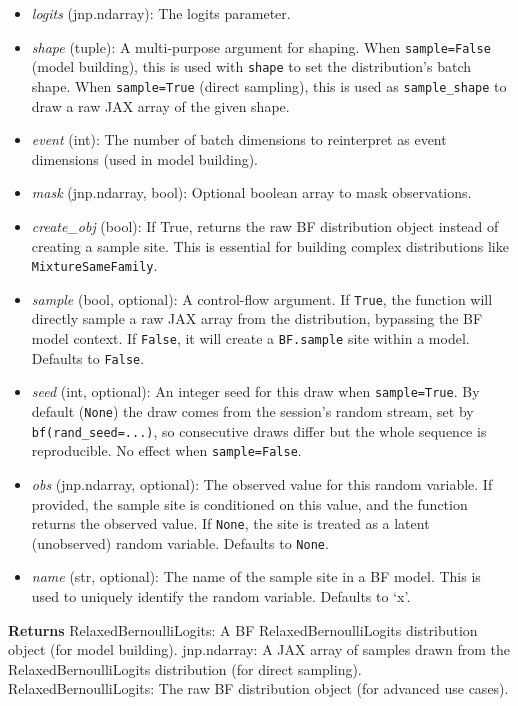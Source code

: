 \documentclass[
  letterpaper,
  DIV=11,
  numbers=noendperiod]{scrartcl}
\begin{document}
\begin{itemize}
\item
  \emph{logits} (jnp.ndarray): The logits parameter.
\item
  \emph{shape} (tuple): A multi-purpose argument for shaping. When
  \texttt{sample=False} (model building), this is used with
  \texttt{shape} to set the distribution's batch shape. When
  \texttt{sample=True} (direct sampling), this is used as
  \texttt{sample\_shape} to draw a raw JAX array of the given shape.
\item
  \emph{event} (int): The number of batch dimensions to reinterpret as
  event dimensions (used in model building).
\item
  \emph{mask} (jnp.ndarray, bool): Optional boolean array to mask
  observations.
\item
  \emph{create\_obj} (bool): If True, returns the raw BF distribution
  object instead of creating a sample site. This is essential for
  building complex distributions like \texttt{MixtureSameFamily}.
\item
  \emph{sample} (bool, optional): A control-flow argument. If
  \texttt{True}, the function will directly sample a raw JAX array from
  the distribution, bypassing the BF model context. If \texttt{False},
  it will create a \texttt{BF.sample} site within a model. Defaults to
  \texttt{False}.
\item
  \emph{seed} (int, optional): An integer seed for this draw when
  \texttt{sample=True}. By default (\texttt{None}) the draw comes from
  the session's random stream, set by \texttt{bf(rand\_seed=...)}, so
  consecutive draws differ but the whole sequence is reproducible. No
  effect when \texttt{sample=False}.
\item
  \emph{obs} (jnp.ndarray, optional): The observed value for this random
  variable. If provided, the sample site is conditioned on this value,
  and the function returns the observed value. If \texttt{None}, the
  site is treated as a latent (unobserved) random variable. Defaults to
  \texttt{None}.
\item
  \emph{name} (str, optional): The name of the sample site in a BF
  model. This is used to uniquely identify the random variable. Defaults
  to `x'.
\end{itemize}

\textbf{Returns} RelaxedBernoulliLogits: A BF RelaxedBernoulliLogits
distribution object (for model building). jnp.ndarray: A JAX array of
samples drawn from the RelaxedBernoulliLogits distribution (for direct
sampling). RelaxedBernoulliLogits: The raw BF distribution object (for
advanced use cases).
\end{document}
